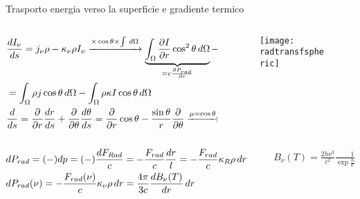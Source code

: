 \begin{frame}{Trasporto energia verso la superficie e gradiente termico}
    \begin{columns}[T]
        \begin{column}{0.6\textwidth}
    \begin{align*}
        &\TDy{s}{I_{\nu}}=j_{\nu}\rho-\kappa_{\nu}\rho I_{\nu}\xrightarrow{\times\cos{\theta}\times\int\,d\Omega}\underbrace{\int_{\Omega}\PDy{r}{I}\cos^2{\theta}\,d\Omega}_{=c\PDy{r}{P_{rad}}}-\underbrace{\int_{\Omega}\frac{1}{r}\PDy{\mu}{I}\cos{\theta}\sin{\theta}\,d\Omega}_{\frac{c}{r}(3P_{rad}-u)}\\
        &=\int_{\Omega}\rho j\cos{\theta}\,d\Omega-\int_{\Omega}\rho\kappa I\cos{\theta}\,d\Omega\\
        &\TDof{s}=\PDof{r}\TDy{s}{r}+\PDof{\theta}\TDy{s}{\theta}=\PDof{r}\cos{\theta}-\frac{\sin{\theta}}{r}\PDof{\theta}\xrightarrow{\mu=\cos{\theta}}\mu\PDof{r}+\invers{r}(1-\mu^2)\PDof{\theta}
    \end{align*}
        \end{column}
        \begin{column}{0.4\textwidth}
            \begin{figure}[!ht]
                \centering
                \texttt{[image: radtransfspheric]}
                \label{fig:gradalongray}
            \end{figure}
        \end{column}
    \end{columns}
    
    \begin{columns}[T]
        \begin{column}{0.7\textwidth}
\begin{align*}
    &dP_{rad}=(-)dp=(-)\frac{dF_{Rad}}{c}=-\frac{F_{rad}}{c}\frac{dr}{l}=-\frac{F_{rad}}{c}\kappa_R\rho\,dr=\frac{4}{3}aT^3dT\\
&dP_{rad}(\nu)=-\frac{F_{rad}(\nu)}{c}\kappa_{\nu}\rho\,dr=\frac{4\pi}{3c}\TDy{r}{B_{\nu}(T)}\,dr
\end{align*}
        \end{column}
        \begin{column}{0.3\textwidth}
\begin{align*}
&B_{\nu}(T)=\frac{2h\nu^3}{c^2}\frac{1}{\exp{\frac{h\nu}{kT}}-1}
\end{align*}
        \end{column}
    \end{columns}


\end{frame}
